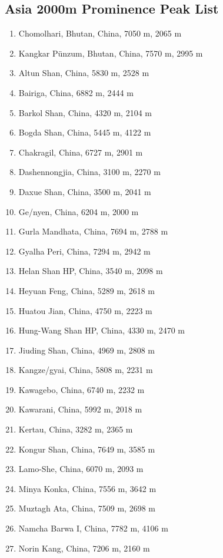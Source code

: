 \documentclass[10pt,twocolumn,letterpaper]{article}
\begin{document}
\subsection{Asia 2000m Prominence Peak List}
\begin{flushleft}
\begin{enumerate}
    \item Chomolhari, Bhutan, China, 7050 m, 2065 m
    \item Kangkar Pünzum, Bhutan, China, 7570 m, 2995 m
    \item Altun Shan, China, 5830 m, 2528 m
    \item Bairiga, China, 6882 m, 2444 m
    \item Barkol Shan, China, 4320 m, 2104 m
    \item Bogda Shan, China, 5445 m, 4122 m
    \item Chakragil, China, 6727 m, 2901 m
    \item Dashennongjia, China, 3100 m, 2270 m
    \item Daxue Shan, China, 3500 m, 2041 m
    \item Ge/nyen, China, 6204 m, 2000 m
    \item Gurla Mandhata, China, 7694 m, 2788 m
    \item Gyalha Peri, China, 7294 m, 2942 m
    \item Helan Shan HP, China, 3540 m, 2098 m
    \item Heyuan Feng, China, 5289 m, 2618 m
    \item Huatou Jian, China, 4750 m, 2223 m
    \item Hung-Wang Shan HP, China, 4330 m, 2470 m
    \item Jiuding Shan, China, 4969 m, 2808 m
    \item Kangze/gyai, China, 5808 m, 2231 m
    \item Kawagebo, China, 6740 m, 2232 m
    \item Kawarani, China, 5992 m, 2018 m
    \item Kertau, China, 3282 m, 2365 m
    \item Kongur Shan, China, 7649 m, 3585 m
    \item Lamo-She, China, 6070 m, 2093 m
    \item Minya Konka, China, 7556 m, 3642 m
    \item Muztagh Ata, China, 7509 m, 2698 m
    \item Namcha Barwa I, China, 7782 m, 4106 m
    \item Norin Kang, China, 7206 m, 2160 m

\end{enumerate}
\end{flushleft}
\end{document}
